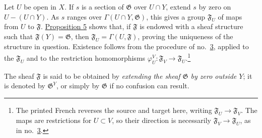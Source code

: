 Let $U$ be open in $X$. If $s$ is a section of $\mathfrak{G}$ over $U\cap Y$, extend $s$ by zero on $U-(U\cap Y)$. As $s$ ranges over $\Gamma(U\cap Y,\mathfrak{G})$, this gives a group $\mathfrak{F}_U$ of maps from $U$ to $\mathfrak{F}$. \hyperref[fac:I:1:no:5:prop:5]{Proposition 5} shows that, if $\mathfrak{F}$ is endowed with a sheaf structure such that $\mathfrak{F}(Y)=\mathfrak{G}$, then $\mathfrak{F}_U=\Gamma(U,\mathfrak{F})$, proving the uniqueness of the structure in question. Existence follows from the procedure of no.~\hyperref[fac:I:1:no:3]{3}, applied to the $\mathfrak{F}_U$ and to the restriction homomorphisms $\varphi_U^V:\mathfrak{F}_V\to\mathfrak{F}_U$.\footnote{The printed French reverses the source and target here, writing $\mathfrak{F}_U\to\mathfrak{F}_V$. The maps are restrictions for $U\subset V$, so their direction is necessarily $\mathfrak{F}_V\to\mathfrak{F}_U$, as in no.~\hyperref[fac:I:1:no:3]{3}.}

The sheaf $\mathfrak{F}$ is said to be obtained by \textit{extending the sheaf $\mathfrak{G}$ by zero outside $Y$}; it is denoted by $\mathfrak{G}^Y$, or simply by $\mathfrak{G}$ if no confusion can result.
